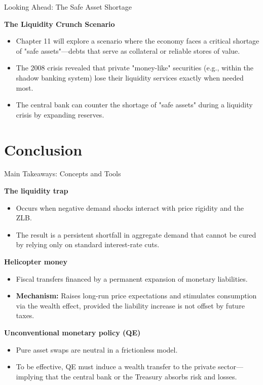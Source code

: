 \documentclass[11pt,aspectratio=169]{beamer}
\begin{document}
\begin{frame}{Looking Ahead: The Safe Asset Shortage}
\small

\textbf{The Liquidity Crunch Scenario}
\vspace{0.3em}
\begin{itemize}
    \item Chapter 11 will explore a scenario where the economy faces a critical shortage of "safe assets"—debts that serve as collateral or reliable stores of value.
\vspace{0.3em}
    \item The 2008 crisis revealed that private "money-like" securities (e.g., within the shadow banking system) lose their liquidity services exactly when needed most.
\vspace{0.3em}
\item The central bank  can counter the shortage of "safe assets" during a liquidity crisis by expanding reserves. 
\end{itemize}

\end{frame}

\section{Conclusion}
\begin{frame}{Main Takeaways: Concepts and Tools}
\small

\textbf{The liquidity trap}
\begin{itemize}
    \item Occurs when negative demand shocks interact with price rigidity and the ZLB.
    \item The result is a persistent shortfall in aggregate demand that cannot be cured by relying only on standard interest-rate cuts.
\end{itemize}

\vspace{0.2cm}

\textbf{Helicopter money}
\begin{itemize}
    \item Fiscal transfers financed by a permanent expansion of monetary liabilities.
    \item \textbf{Mechanism:} Raises long-run price expectations and stimulates consumption via the wealth effect, provided the liability increase is not offset by future taxes.
\end{itemize}

\vspace{0.2cm}

\textbf{Unconventional monetary policy (QE)}
\begin{itemize}
    \item Pure asset swaps are neutral in a frictionless model.
    \item To be effective, QE must induce a wealth transfer to the private sector—implying that the central bank or the Treasury absorbs risk and losses.
\end{itemize}
\end{frame}
\end{document}
